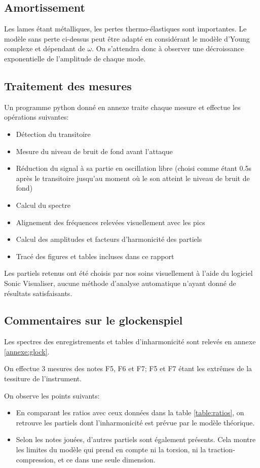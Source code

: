 \documentclass[atiam, article]{rapport} %
\begin{document}
\subsection{Amortissement}

Les lames étant métalliques, les pertes thermo-élastiques sont importantes. Le modèle sans perte ci-dessus peut être adapté en considérant le modèle d'Young complexe et dépendant de $\omega$. On s'attendra donc à observer une décroissance exponentielle de l'amplitude de chaque mode.

\subsection{Traitement des mesures}

Un programme python donné en annexe traite chaque mesure et effectue les opérations suivantes:
\begin{itemize}
  \item Détection du transitoire
  \item Mesure du niveau de bruit de fond avant l'attaque
  \item Réduction du signal à sa partie en oscillation libre (choisi comme étant 0.5s après le transitoire jusqu'au moment où le son atteint le niveau de bruit de fond)
  \item Calcul du spectre
  \item Alignement des fréquences relevées visuellement avec les pics
  \item Calcul des amplitudes et facteurs d'harmonicité des partiels
  \item Tracé des figures et tables incluses dans ce rapport
\end{itemize}

Les partiels retenus ont été choisis par nos soins visuellement à l'aide du logiciel Sonic Visualiser, aucune méthode d'analyse automatique n'ayant donné de résultats satisfaisants.

\subsection{Commentaires sur le glockenspiel}
Les spectres des enregistrements et tables d'inharmonicité sont relevés en annexe \ref{annexe:glock}.

On effectue 3 mesures des notes F5, F6 et F7; F5 et F7 étant les extrêmes de la tessiture de l'instrument.

On observe les points suivants:
\begin{itemize}
  \item En comparant les ratios avec ceux données dans la table \ref{table:ratios}, on retrouve les partiels dont l'inharmonicité est prévue par le modèle théorique.
  \item Selon les notes jouées, d'autres partiels sont également présents. Cela montre les limites du modèle qui prend en compte ni la torsion, ni la traction-compression, et ce dans une seule dimension.
\end{itemize}
\end{document}
